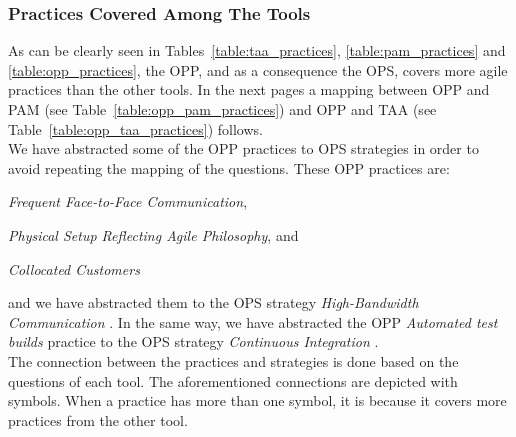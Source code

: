 \subsubsection[Tool Practices]{Practices Covered Among The Tools}
\label{subsubsec:practices_among_tools}

As can be clearly seen in Tables~\ref{table:taa_practices}, \ref{table:pam_practices} and \ref{table:opp_practices}, the \ac{OPP}, and as a consequence the \ac{OPS}, covers more agile practices than the other tools. In the next pages a mapping between \ac{OPP} and \ac{PAM} (see Table~\ref{table:opp_pam_practices}) and \ac{OPP} and \ac{TAA} (see Table~\ref{table:opp_taa_practices}) follows. \\

We have abstracted some of the \ac{OPP} practices to \ac{OPS} strategies in order to avoid repeating the mapping of the questions. These \ac{OPP} practices are: 
\begin{inparaenum} [a\upshape)]
	\item \textit{Frequent Face-to-Face Communication},
	\item \textit{Physical Setup Reflecting Agile Philosophy}, and
	\item \textit{Collocated Customers}
\end{inparaenum} and we have abstracted them to the \ac{OPS} strategy \textit{High-Bandwidth Communication}  \cite[p. 57]{sventha_dissertation}. In the same way, we have abstracted the \ac{OPP} \textit{Automated test builds} practice to the \ac{OPS} strategy \textit{Continuous Integration} \cite[p. 57]{sventha_dissertation}. \\

The connection between the practices and strategies is done based on the questions of each tool. The aforementioned connections are depicted with symbols. When a practice has more than one symbol, it is because it covers more practices from the other tool. \\


